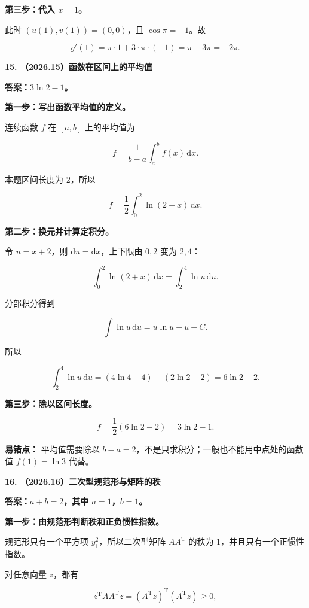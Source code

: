 \documentclass[UTF8,11pt,fontset=windows]{ctexart}
\begin{document}
\textbf{第三步：代入 $x=1$。}

此时 $(u(1),v(1))=(0,0)$，且 $\cos\pi=-1$。故

$$
g'(1)=\pi\cdot1+3\cdot\pi\cdot(-1)
=\pi-3\pi=\boxed{-2\pi}.
$$

\clearpage

\textbf{15. （2026.15）函数在区间上的平均值}

\textbf{答案：$3\ln2-1$。}

\textbf{第一步：写出函数平均值的定义。}

连续函数 $f$ 在 $[a,b]$ 上的平均值为

$$
\overline f=\frac1{b-a}\int_a^bf(x)\,\mathrm{d}x.
$$

本题区间长度为 $2$，所以

$$
\overline f=\frac12\int_0^2\ln(2+x)\,\mathrm{d}x.
$$

\textbf{第二步：换元并计算定积分。}

令 $u=x+2$，则 $\mathrm{d}u=\mathrm{d}x$，上下限由 $0,2$ 变为 $2,4$：

$$
\int_0^2\ln(2+x)\,\mathrm{d}x=\int_2^4\ln u\,\mathrm{d}u.
$$

分部积分得到

$$
\int\ln u\,\mathrm{d}u=u\ln u-u+C.
$$

所以

$$
\int_2^4\ln u\,\mathrm{d}u
=(4\ln4-4)-(2\ln2-2)
=6\ln2-2.
$$

\textbf{第三步：除以区间长度。}

$$
\overline f=\frac12(6\ln2-2)=\boxed{3\ln2-1}.
$$

\textbf{易错点：} 平均值需要除以 $b-a=2$，不是只求积分；一般也不能用中点处的函数值 $f(1)=\ln3$ 代替。

\clearpage

\textbf{16. （2026.16）二次型规范形与矩阵的秩}

\textbf{答案：$a+b=2$，其中 $a=1$，$b=1$。}

\textbf{第一步：由规范形判断秩和正负惯性指数。}

规范形只有一个平方项 $y_1^2$，所以二次型矩阵 $AA^{\mathrm T}$ 的秩为 $1$，并且只有一个正惯性指数。

对任意向量 $z$，都有

$$
z^{\mathrm T}AA^{\mathrm T}z
=(A^{\mathrm T}z)^{\mathrm T}(A^{\mathrm T}z)\ge0,
$$
\end{document}
